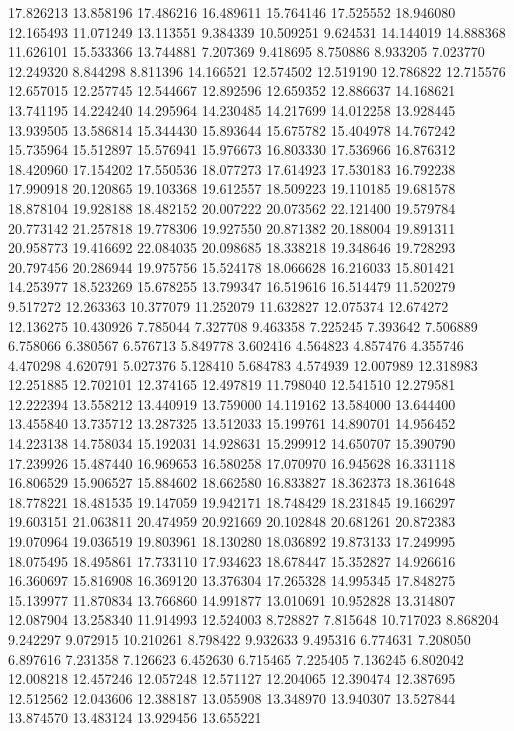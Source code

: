 17.826213
13.858196
17.486216
16.489611
15.764146
17.525552
18.946080
12.165493
11.071249
13.113551
9.384339
10.509251
9.624531
14.144019
14.888368
11.626101
15.533366
13.744881
7.207369
9.418695
8.750886
8.933205
7.023770
12.249320
8.844298
8.811396
14.166521
12.574502
12.519190
12.786822
12.715576
12.657015
12.257745
12.544667
12.892596
12.659352
12.886637
14.168621
13.741195
14.224240
14.295964
14.230485
14.217699
14.012258
13.928445
13.939505
13.586814
15.344430
15.893644
15.675782
15.404978
14.767242
15.735964
15.512897
15.576941
15.976673
16.803330
17.536966
16.876312
18.420960
17.154202
17.550536
18.077273
17.614923
17.530183
16.792238
17.990918
20.120865
19.103368
19.612557
18.509223
19.110185
19.681578
18.878104
19.928188
18.482152
20.007222
20.073562
22.121400
19.579784
20.773142
21.257818
19.778306
19.927550
20.871382
20.188004
19.891311
20.958773
19.416692
22.084035
20.098685
18.338218
19.348646
19.728293
20.797456
20.286944
19.975756
15.524178
18.066628
16.216033
15.801421
14.253977
18.523269
15.678255
13.799347
16.519616
16.514479
11.520279
9.517272
12.263363
10.377079
11.252079
11.632827
12.075374
12.674272
12.136275
10.430926
7.785044
7.327708
9.463358
7.225245
7.393642
7.506889
6.758066
6.380567
6.576713
5.849778
3.602416
4.564823
4.857476
4.355746
4.470298
4.620791
5.027376
5.128410
5.684783
4.574939
12.007989
12.318983
12.251885
12.702101
12.374165
12.497819
11.798040
12.541510
12.279581
12.222394
13.558212
13.440919
13.759000
14.119162
13.584000
13.644400
13.455840
13.735712
13.287325
13.512033
15.199761
14.890701
14.956452
14.223138
14.758034
15.192031
14.928631
15.299912
14.650707
15.390790
17.239926
15.487440
16.969653
16.580258
17.070970
16.945628
16.331118
16.806529
15.906527
15.884602
18.662580
16.833827
18.362373
18.361648
18.778221
18.481535
19.147059
19.942171
18.748429
18.231845
19.166297
19.603151
21.063811
20.474959
20.921669
20.102848
20.681261
20.872383
19.070964
19.036519
19.803961
18.130280
18.036892
19.873133
17.249995
18.075495
18.495861
17.733110
17.934623
18.678447
15.352827
14.926616
16.360697
15.816908
16.369120
13.376304
17.265328
14.995345
17.848275
15.139977
11.870834
13.766860
14.991877
13.010691
10.952828
13.314807
12.087904
13.258340
11.914993
12.524003
8.728827
7.815648
10.717023
8.868204
9.242297
9.072915
10.210261
8.798422
9.932633
9.495316
6.774631
7.208050
6.897616
7.231358
7.126623
6.452630
6.715465
7.225405
7.136245
6.802042
12.008218
12.457246
12.057248
12.571127
12.204065
12.390474
12.387695
12.512562
12.043606
12.388187
13.055908
13.348970
13.940307
13.527844
13.874570
13.483124
13.929456
13.655221

